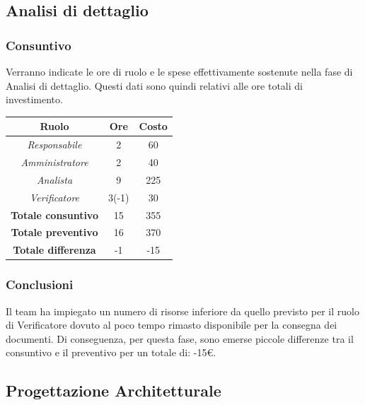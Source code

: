 \subsection{Analisi di dettaglio}

\subsubsection{Consuntivo}

Verranno indicate le ore di ruolo e le spese effettivamente sostenute nella fase di Analisi di dettaglio. Questi dati sono quindi relativi alle ore totali di investimento.

\begin{center}
	\centering
	\begin{tabular}{|c|c|c|}
		\hline
		\textbf{Ruolo} & \textbf{Ore} & \textbf{Costo} \\
		\hline
		\emph{Responsabile}  & 2 & 60 \\
		\hline  \emph{Amministratore}  & 2 & 40 \\
		\hline  \emph{Analista}  &  9&225  \\
		\hline  \emph{Verificatore}  &3(-1)  &30  \\
		\hline
		\textbf{Totale consuntivo} &  15&355  \\
		\hline
		\textbf{Totale preventivo} &  16&  370\\
		\hline
		\textbf{Totale differenza} & -1 & -15 \\
		\hline
	\end{tabular}
	
\end{center}

\subsubsection{Conclusioni}

Il team ha impiegato un numero di risorse inferiore da quello previsto per il ruolo di Verificatore dovuto al poco tempo rimasto disponibile per la consegna dei documenti. Di conseguenza, per questa fase, sono emerse piccole differenze tra il consuntivo e il preventivo per un totale di: -15€.

\subsection{Progettazione Architetturale}

